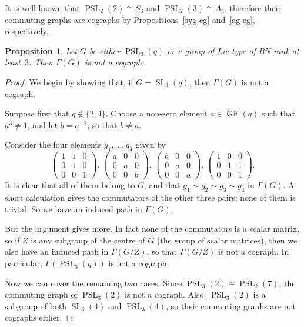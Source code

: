 \documentclass{elsarticle}
\newtheorem{prop}[theorem]{Proposition}
\newcommand{\PSL}{\mathop{\mathrm{PSL}}\nolimits}
\newcommand{\SL}{\mathop{\mathrm{SL}}\nolimits}
\newcommand{\GF}{\mathop{\mathrm{GF}}\nolimits}
\begin{document}
\begin{remark} It is well-known that $\PSL_2(2)\cong S_3$ and $\PSL_2(3)\cong A_4$, therefore their commuting graphs are cographs by Propositions~{\rm\ref{syg-cg}} and~{\rm\ref{ag-cg}}, respectively.
\end{remark}

\begin{prop}\label{cog-PSL}
Let $G$ be either $\PSL_3(q)$ or a group of Lie type of BN-rank at least~$3$.
Then $\Gamma(G)$ is not a cograph.
\end{prop}

\begin{proof}
We begin by showing that, if $G=\SL_3(q)$, then $\Gamma(G)$ is not a cograph.

Suppose first that $q\notin\{2,4\}$. Choose a non-zero element $a\in\GF(q)$
such that $a^3\ne1$, and let $b=a^{-2}$, so that $b\ne a$.

Consider the four elements $g_1,\ldots,g_4$ given by
\[
\left(\begin{array}{ccc}1&1&0\\0&1&0\\0&0&1\end{array}\right),\,
\left(\begin{array}{ccc}a&0&0\\0&a&0\\0&0&b\end{array}\right),\,
\left(\begin{array}{ccc}b&0&0\\0&a&0\\0&0&a\end{array}\right),\,
\left(\begin{array}{ccc}1&0&0\\0&1&1\\0&0&1\end{array}\right).
\]
It is clear that all of them belong to $G$, and that
$g_1\sim g_2\sim g_3\sim g_4$ in $\Gamma(G)$. A short calculation gives the
commutators of the other three pairs; none of them is trivial. So we have
an induced path in $\Gamma(G)$.

But the argument gives more. In fact none of the commutators is a scalar
matrix, so if $Z$ is any subgroup of the centre of $G$ (the group of scalar
matrices), then we also have an induced path in $\Gamma(G/Z)$, so that
$\Gamma(G/Z)$ is not a cograph. In particular, $\Gamma(\PSL_3(q))$ is not a
cograph.

Now we can cover the remaining two cases. Since $\PSL_3(2)\cong\PSL_2(7)$,
the commuting graph of $\PSL_3(2)$ is not a cograph. Also, $\PSL_3(2)$ is a
subgroup of both $\SL_3(4)$ and $\PSL_3(4)$, so their commuting graphs are not
cographs either.


\end{proof}
\end{document}
